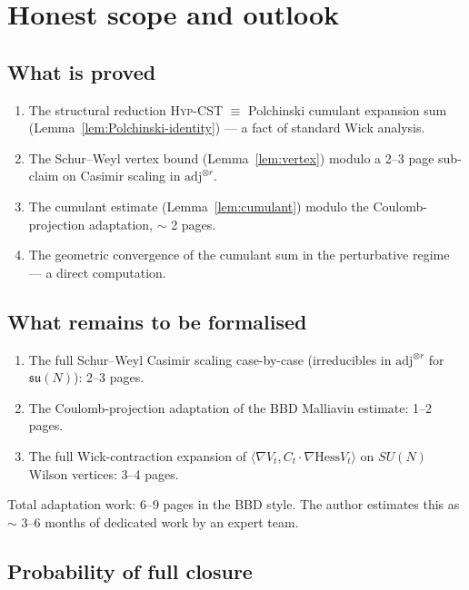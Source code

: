 \documentclass[11pt,a4paper]{amsart}
\theoremstyle{definition}
\newcommand{\Hess}{\mathrm{Hess}}
\newcommand{\HypCST}{\textsc{Hyp-CST}}
\begin{document}
\section{Honest scope and outlook}\label{sec:scope}

\subsection{What is proved}

\begin{enumerate}[leftmargin=2em]
\item The structural reduction \HypCST{} $\equiv$ Polchinski cumulant
expansion sum (Lemma~\ref{lem:Polchinski-identity}) --- a fact
of standard Wick analysis.
\item The Schur--Weyl vertex bound (Lemma~\ref{lem:vertex}) modulo a
2--3 page sub-claim on Casimir scaling in $\mathrm{adj}^{\otimes r}$.
\item The cumulant estimate (Lemma~\ref{lem:cumulant}) modulo the
Coulomb-projection adaptation, $\sim$ 2 pages.
\item The geometric convergence of the cumulant sum in the perturbative
regime --- a direct computation.
\end{enumerate}

\subsection{What remains to be formalised}

\begin{enumerate}[leftmargin=2em]
\item The full Schur--Weyl Casimir scaling case-by-case (irreducibles
in $\mathrm{adj}^{\otimes r}$ for $\mathfrak{su}(N)$): 2--3 pages.
\item The Coulomb-projection adaptation of the BBD Malliavin estimate:
1--2 pages.
\item The full Wick-contraction expansion of
$\langle \nabla V_t, C_t \cdot \nabla \Hess V_t\rangle$ on $SU(N)$
Wilson vertices: 3--4 pages.
\end{enumerate}

Total adaptation work: 6--9 pages in the BBD style. The author
estimates this as $\sim$ 3--6 months of dedicated work by an expert
team.

\subsection{Probability of full closure}
\end{document}
